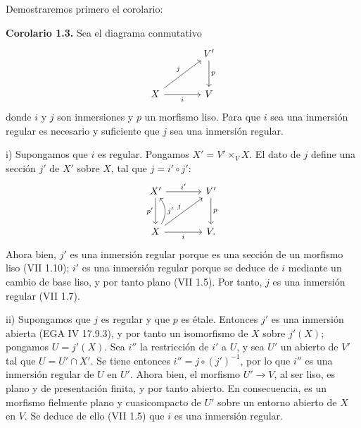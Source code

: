 Demostraremos primero el corolario:

\textbf{Corolario 1.3.} Sea el diagrama conmutativo
\[
\begin{tikzcd}[column sep=large,row sep=large]
& V' \arrow[d,"p"]\\
X \arrow[ur,"j"] \arrow[r,"i"'] & V
\end{tikzcd}
\]
donde $i$ y $j$ son inmersiones y $p$ un morfismo liso. Para que $i$ sea una
inmersión regular es necesario y suficiente que $j$ sea una inmersión regular.

i) Supongamos que $i$ es regular. Pongamos $X'=V'\times_V X$. El dato de $j$
define una sección $j'$ de $X'$ sobre $X$, tal que $j=i'\circ j'$:
\[
\begin{tikzcd}[column sep=large,row sep=large]
X' \arrow[r,"i'"] \arrow[d,"p'"'] & V' \arrow[d,"p"]\\
X \arrow[r,"i"'] \arrow[ur,"j"] \arrow[u,bend right=35,"j'"'] & V .
\end{tikzcd}
\]
Ahora bien, $j'$ es una inmersión regular porque es una sección de un
morfismo liso (VII 1.10); $i'$ es una inmersión regular porque se deduce de
$i$ mediante un cambio de base liso, y por tanto plano (VII 1.5). Por tanto,
$j$ es una inmersión regular (VII 1.7).

ii) Supongamos que $j$ es regular y que $p$ es étale. Entonces $j'$ es una
inmersión abierta (EGA IV 17.9.3), y por tanto un isomorfismo de $X$ sobre
$j'(X)$; pongamos $U=j'(X)$. Sea $i''$ la restricción de $i'$ a $U$, y sea
$U'$ un abierto de $V'$ tal que $U=U'\cap X'$. Se tiene entonces
$i''=j\circ(j')^{-1}$, por lo que $i''$ es una inmersión regular de $U$ en
$U'$. Ahora bien, el morfismo $U'\to V$, al ser liso, es plano y de
presentación finita, y por tanto abierto. En consecuencia, es un morfismo
fielmente plano y cuasicompacto de $U'$ sobre un entorno abierto de $X$ en
$V$. Se deduce de ello (VII 1.5) que $i$ es una inmersión regular.

